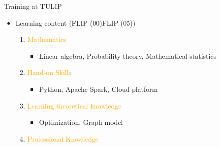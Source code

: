 \documentclass[
 size=14pt,
 paper=smartboard,  %
 mode=present, 		%
 display=slides, 	%
 pauseslide,
 fleqn,leqno]{powerdot}{}
\begin{document}
\begin{slide}[toc=,bm=]{Training at TULIP}
    \begin{itemize}
      \item Learning content (FLIP (00)\texttildelow FLIP (05))
        \begin{enumerate}
          \item \textcolor{orange}{Mathematics}
            \begin{itemize}
              \item Linear algebra,
                    Probability theory,
                    Mathematical statistics
            \end{itemize}
          \item \textcolor{orange}{Hand-on Skills}
            \begin{itemize}
              \item Python,
                    Apache Spark,
                    Cloud platform
            \end{itemize}
          \item \textcolor{orange}{Learning theoretical knowledge}
            \begin{itemize}
              \item Optimization,
                    Graph model
            \end{itemize}
          \item \textcolor{orange}{Professional Knowledge}
        \end{enumerate}
    \end{itemize}
\end{slide}
\end{document}
